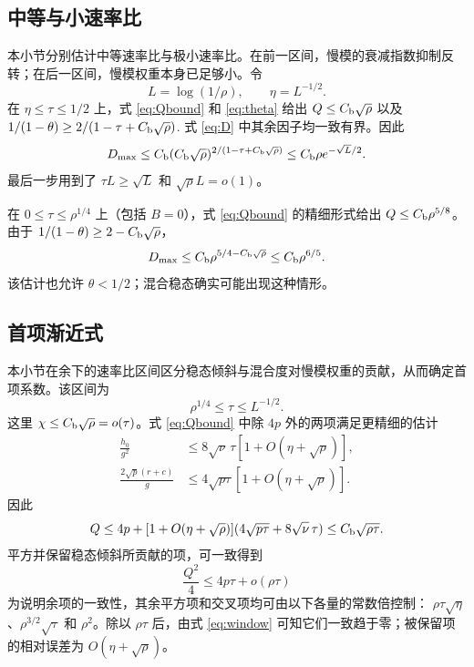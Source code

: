 \documentclass[aps,pra,reprint,amsmath,amssymb,nofootinbib,floatfix,longbibliography]{revtex4-2}
\theoremstyle{aps}
\begin{document}
\subsection{中等与小速率比}

本小节分别估计中等速率比与极小速率比。在前一区间，慢模的衰减指数抑制反转；在后一区间，慢模权重本身已足够小。令
\begin{equation}\label{eq:Leta}
 L=\log(1/\rho),\qquad\eta=L^{-1/2}.
\end{equation}
在 $\eta\le\tau\le1/2$ 上，式 \eqref{eq:Qbound} 和 \eqref{eq:theta} 给出
$Q\le C_{\rm b}\sqrt\rho$ 以及
$1/(1-\theta)\ge2/(1-\tau+C_{\rm b}\sqrt\rho)$.
式 \eqref{eq:D} 中其余因子均一致有界。因此
\begin{equation}\label{eq:intermediate}
 D_{\max}\le C_{\rm b}(C_{\rm b}\sqrt\rho)^{2/(1-\tau+C_{\rm b}\sqrt\rho)}
 \le C_{\rm b}\rho e^{-\sqrt L/2}.
\end{equation}
最后一步用到了 $\tau L\ge\sqrt L$ 和 $\sqrt\rho L=o(1)$。

在 $0\le\tau\le\rho^{1/4}$ 上（包括 $B=0$），式 \eqref{eq:Qbound} 的精细形式给出 $Q\le C_{\rm b}\rho^{5/8}$。由于 $1/(1-\theta)\ge2-C_{\rm b}\sqrt\rho$，
\begin{equation}\label{eq:tiny}
 D_{\max}\le C_{\rm b}\rho^{5/4-C_{\rm b}\sqrt\rho}\le C_{\rm b}\rho^{6/5}.
\end{equation}
该估计也允许 $\theta<1/2$；混合稳态确实可能出现这种情形。

\subsection{首项渐近式}

本小节在余下的速率比区间区分稳态倾斜与混合度对慢模权重的贡献，从而确定首项系数。该区间为
\begin{equation}\label{eq:window}
 \rho^{1/4}\le\tau\le L^{-1/2}.
\end{equation}
这里 $\chi\le C_{\rm b}\sqrt\rho=o(\tau)$。式 \eqref{eq:Qbound} 中除 $4p$ 外的两项满足更精细的估计
\begin{equation}\label{eq:sharpQparts}
 \begin{aligned}
 \frac{h_0}{g^2}
 &\le8\sqrt\nu\,\tau[1+O(\eta+\sqrt\rho)],\\
 \frac{2\sqrt p(r+c)}g
 &\le4\sqrt{p\tau}[1+O(\eta+\sqrt\rho)].
 \end{aligned}
\end{equation}
因此
\begin{equation}\label{eq:sharpQ}
 Q\le4p+[1+O(\eta+\sqrt\rho)]
 (4\sqrt{p\tau}+8\sqrt\nu\,\tau)
 \le C_{\rm b}\sqrt{\rho\tau}.
\end{equation}
平方并保留稳态倾斜所贡献的项，可一致得到
\begin{equation}\label{eq:Qsquared}
 \frac{Q^2}{4}\le4p\tau+o(\rho\tau)
\end{equation}
为说明余项的一致性，其余平方项和交叉项均可由以下各量的常数倍控制：
$\rho\tau\sqrt\eta$、$\rho^{3/2}\sqrt\tau$ 和 $\rho^2$。除以 $\rho\tau$ 后，由式 \eqref{eq:window} 可知它们一致趋于零；被保留项的相对误差为 $O(\eta+\sqrt\rho)$。
\end{document}
